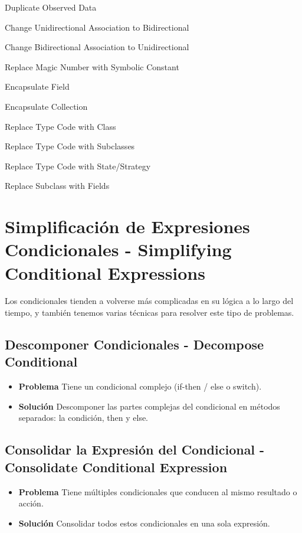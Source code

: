 \documentclass[11pt,a4paper,oneside]{book}
\begin{document}
    Duplicate Observed Data
    
    Change Unidirectional Association to Bidirectional
    
    Change Bidirectional Association to Unidirectional
    
    Replace Magic Number with Symbolic Constant
    
    Encapsulate Field
    
    Encapsulate Collection
    
    Replace Type Code with Class
    
    Replace Type Code with Subclasses
    
    Replace Type Code with State/Strategy
    
    Replace Subclass with Fields




\section{Simplificación de Expresiones Condicionales - Simplifying Conditional Expressions}

\label{renombrarmetodo}Los condicionales tienden a volverse más complicadas en su lógica a lo largo del tiempo, y también tenemos varias técnicas para resolver este tipo de problemas.

\subsection{Descomponer Condicionales - Decompose Conditional}  
\begin{itemize}
    \item \textbf{Problema} Tiene un condicional complejo (if-then / else o switch).
    
    
    
    \item \textbf{Solución} Descomponer las partes complejas del condicional en métodos separados: la condición, then y else.
    
    
\end{itemize}

\subsection{Consolidar la Expresión del Condicional - Consolidate Conditional Expression}  \begin{itemize}
    \item \textbf{Problema} Tiene múltiples condicionales que conducen al mismo resultado o acción.
    
    
    
    \item \textbf{Solución} Consolidar todos estos condicionales en una sola expresión.
    
    
\end{itemize}
    
\end{document}
